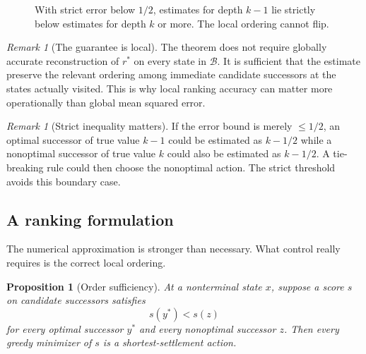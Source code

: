 \documentclass[11pt,letterpaper]{article}
\newtheorem{proposition}[theorem]{Proposition}
\theoremstyle{remark}
\newtheorem{remark}[theorem]{Remark}
\newcommand{\Basin}{\mathcal B}
\newcommand{\rstar}{r^{\!*}}
\newcommand{\rhat}{\widehat r}
\begin{document}
\begin{figure}[ht]
\centering
{}
\caption{With strict error below $1/2$, estimates for depth $k-1$ lie strictly below estimates for depth $k$ or more. The local ordering cannot flip.}
\label{fig:halfstep}
\end{figure}

\begin{remark}[The guarantee is local]
The theorem does not require globally accurate reconstruction of $\rstar$ on every state in $\Basin$. It is sufficient that the estimate preserve the relevant ordering among immediate candidate successors at the states actually visited. This is why local ranking accuracy can matter more operationally than global mean squared error.
\end{remark}

\begin{remark}[Strict inequality matters]
If the error bound is merely $\le1/2$, an optimal successor of true value $k-1$ could be estimated as $k-1/2$ while a nonoptimal successor of true value $k$ could also be estimated as $k-1/2$. A tie-breaking rule could then choose the nonoptimal action. The strict threshold avoids this boundary case.
\end{remark}

\subsection{A ranking formulation}

The numerical approximation is stronger than necessary. What control really requires is the correct local ordering.

\begin{proposition}[Order sufficiency]\label{prop:order}
At a nonterminal state $x$, suppose a score $s$ on candidate successors satisfies
\[
s(y^*)<s(z)
\]
for every optimal successor $y^*$ and every nonoptimal successor $z$. Then every greedy minimizer of $s$ is a shortest-settlement action.
\end{proposition}
\end{document}
